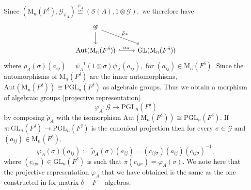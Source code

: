 \documentclass[preprint, 11pt]{amsart}
\theoremstyle{corollary}
\theoremstyle{remark}
\theoremstyle{proposition}
\numberwithin{equation}{subsection}
\begin{document}
Since $\left(\mathrm{M}_n(F^{\delta}), \mathscr G_{\psi_A}\right)\overset{\psi_A}{\cong} \left(\mathscr S(A), 1\otimes \mathscr G\right),$  we therefore have  \begin{equation}\label{algebraicgrouprepmnc}
		\begin{tikzcd}
			\mathscr{G}\arrow[dr, rightarrow, "\tilde{\rho}_A"] \arrow[d, rightarrow]& \\
			\mathrm{Aut}(\mathrm{M}_n(F^{\delta}))\arrow[r, hookrightarrow,"inc"]&\mathrm{GL}(\mathrm{M}_n(F^{\delta}))
		\end{tikzcd}
	\end{equation}
	where $\tilde{\rho}_A(\sigma)(a_{ij})=\psi^{-1}_A(1\otimes \sigma) \psi_A(a_{ij}),$ for $(a_{ij})\in \mathrm{M}_n(F^\delta).$
  Since the automorphisms of $\mathrm{M}_n(F^{\delta})$ are the inner automorphisms, $\mathrm{Aut}(\mathrm{M}_n(F^{\delta}))\cong \mathrm{PGL}_n(F^{\delta})$ as algebraic groups. Thus we obtain a morphism of algebraic groups (projective representation) \begin{equation}\label{projectiverepresentation}\varphi_A: \mathscr G\rightarrow \mathrm{PGL}_n(F^{\delta})\end{equation} by composing $\tilde{\rho}_A$ with the isomorphism  $\mathrm{Aut}(\mathrm{M}_n(F^{\delta}))\cong \mathrm{PGL}_n(F^{\delta}).$ If $\pi: \mathrm{GL}_n(F^{\delta})\to \mathrm{PGL}_n(F^{\delta})$ is the canonical projection then  for every $\sigma\in \mathscr G$ and $(a_{ij})\in \mathrm{M}_n(F^{\delta}),$ 
	\begin{equation}\label{rhoasconjugation}\varphi_A(\sigma)(a_{ij}):=\tilde{\rho}_A(\sigma)(a_{ij})=(c_{ij\sigma})(a_{ij}) (c_{ij\sigma})^{-1},\end{equation} where  $(c_{ij\sigma})\in \mathrm{GL}_n(F^{\delta})$ is such that $\pi(c_{ij\sigma})=\varphi_A(\sigma).$   We note here that the projective representation $\varphi_A$ that we have obtained is the same as the one constructed in \cite[Section 3]{JM08} for matrix $\delta-F-$algebras.
	
\end{document}
